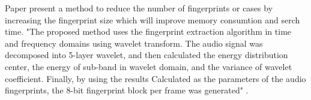  

Paper \cite{6497946} present a method to reduce the number of fingerprints or cases by increasing the fingerprint size which will improve memory consumtion and serch time.
"The proposed method uses the fingerprint extraction algorithm in time and frequency domains using wavelet transform. The audio signal was decomposed into 5-layer wavelet, and then calculated the energy distribution center, the energy of sub-band in wavelet domain, and the variance of wavelet coefficient. Finally, by using the results Calculated as the parameters of the audio fingerprints, the 8-bit fingerprint block per frame was generated" \cite{6497946}.
